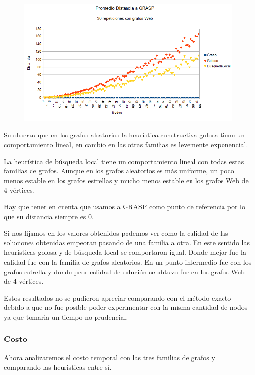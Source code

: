 \begin{figure}[H]
	\centering
	\includegraphics[scale=0.6]{distancia-Grasp-Web.png}
\end{figure}

\quad Se observa que en los grafos aleatorios la heurística constructiva golosa tiene un comportamiento lineal, en cambio en las otras familias es levemente exponencial.

\quad La heurística de búsqueda local tiene un comportamiento lineal con todas estas familias de grafos. Aunque en los grafos aleatorios es más uniforme, un poco menos estable en los grafos estrellas y mucho menos estable en los grafos Web de 4 vértices.

\quad Hay que tener en cuenta que usamos a GRASP como punto de referencia por lo que su distancia siempre es 0.

\quad Si nos fijamos en los valores obtenidos podemos ver como la calidad de las soluciones obtenidas empeoran pasando de una familia a otra. En este sentido las heuristicas golosa y de búsqueda local se comportaron igual. Donde mejor fue la calidad fue con la familia de grafos aleatorios. En un punto intermedio fue con los grafos estrella y donde peor calidad de solución se obtuvo fue en los grafos Web de 4 vértices.

\quad Estos resultados no se pudieron apreciar comparando con el método exacto debido a que no fue posible  poder experimentar con la misma cantidad de nodos ya que tomaria un tiempo no prudencial.

\subsubsection{Costo}

\quad Ahora analizaremos el costo temporal con las tres familias de grafos y comparando las heuristicas entre sí.

